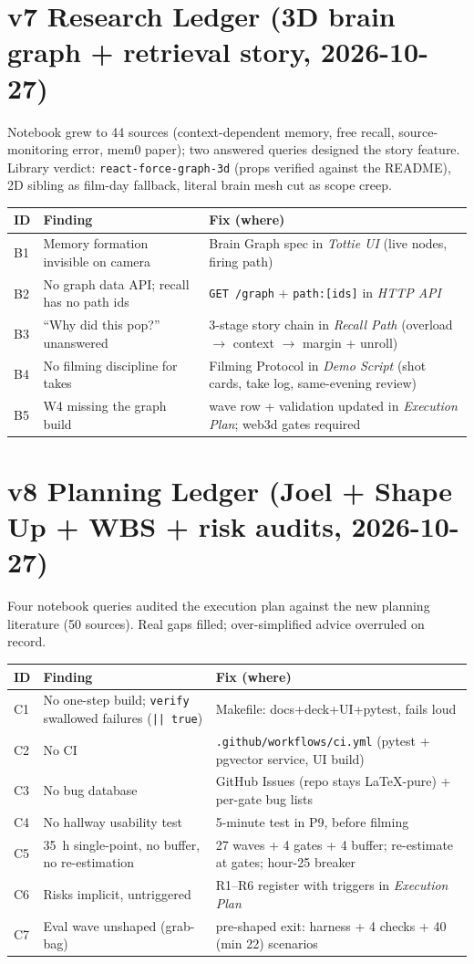 \section{v7 Research Ledger (3D brain graph + retrieval story, 2026-10-27)}
Notebook grew to 44 sources (context-dependent memory, free recall, source-monitoring error,
mem0 paper); two answered queries designed the story feature. Library verdict:
\texttt{react-force-graph-3d} (props verified against the README), 2D sibling as film-day
fallback, literal brain mesh cut as scope creep.
\begin{longtable}{@{}p{}p{}p{}@{}}
\toprule
ID & Finding & Fix (where) \\
\midrule
B1 & Memory formation invisible on camera & Brain Graph spec in \emph{Tottie UI} (live nodes, firing path) \\
B2 & No graph data API; recall has no path ids & \texttt{GET /graph} + \texttt{path:[ids]} in \emph{HTTP API} \\
B3 & ``Why did this pop?'' unanswered & 3-stage story chain in \emph{Recall Path} (overload $\rightarrow$ context $\rightarrow$ margin + unroll) \\
B4 & No filming discipline for takes & Filming Protocol in \emph{Demo Script} (shot cards, take log, same-evening review) \\
B5 & W4 missing the graph build & wave row + validation updated in \emph{Execution Plan}; web3d gates required \\
\bottomrule
\end{longtable}

\section{v8 Planning Ledger (Joel + Shape Up + WBS + risk audits, 2026-10-27)}
Four notebook queries audited the execution plan against the new planning literature (50
sources). Real gaps filled; over-simplified advice overruled on record.
\begin{longtable}{@{}p{}p{}p{}@{}}
\toprule
ID & Finding & Fix (where) \\
\midrule
C1 & No one-step build; \texttt{verify} swallowed failures (\texttt{|| true}) & Makefile: docs+deck+UI+pytest, fails loud \\
C2 & No CI & \texttt{.github/workflows/ci.yml} (pytest + pgvector service, UI build) \\
C3 & No bug database & GitHub Issues (repo stays LaTeX-pure) + per-gate bug lists \\
C4 & No hallway usability test & 5-minute test in P9, before filming \\
C5 & 35~h single-point, no buffer, no re-estimation & 27 waves + 4 gates + 4 buffer; re-estimate at gates; hour-25 breaker \\
C6 & Risks implicit, untriggered & R1--R6 register with triggers in \emph{Execution Plan} \\
C7 & Eval wave unshaped (grab-bag) & pre-shaped exit: harness + 4 checks + 40 (min 22) scenarios \\
\bottomrule
\end{longtable}

